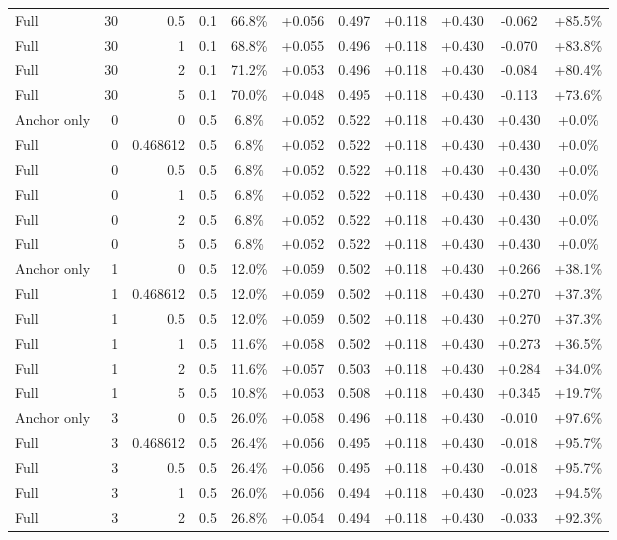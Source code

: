 \begin{table}[htbp]
\begin{tabular}{lrrrccccccc}
Full & 30 & 0.5 & 0.1 & 66.8\% & +0.056 & 0.497 & +0.118 & +0.430 & -0.062 & +85.5\% \\
Full & 30 & 1 & 0.1 & 68.8\% & +0.055 & 0.496 & +0.118 & +0.430 & -0.070 & +83.8\% \\
Full & 30 & 2 & 0.1 & 71.2\% & +0.053 & 0.496 & +0.118 & +0.430 & -0.084 & +80.4\% \\
Full & 30 & 5 & 0.1 & 70.0\% & +0.048 & 0.495 & +0.118 & +0.430 & -0.113 & +73.6\% \\
Anchor only & 0 & 0 & 0.5 & 6.8\% & +0.052 & 0.522 & +0.118 & +0.430 & +0.430 & +0.0\% \\
Full & 0 & 0.468612 & 0.5 & 6.8\% & +0.052 & 0.522 & +0.118 & +0.430 & +0.430 & +0.0\% \\
Full & 0 & 0.5 & 0.5 & 6.8\% & +0.052 & 0.522 & +0.118 & +0.430 & +0.430 & +0.0\% \\
Full & 0 & 1 & 0.5 & 6.8\% & +0.052 & 0.522 & +0.118 & +0.430 & +0.430 & +0.0\% \\
Full & 0 & 2 & 0.5 & 6.8\% & +0.052 & 0.522 & +0.118 & +0.430 & +0.430 & +0.0\% \\
Full & 0 & 5 & 0.5 & 6.8\% & +0.052 & 0.522 & +0.118 & +0.430 & +0.430 & +0.0\% \\
Anchor only & 1 & 0 & 0.5 & 12.0\% & +0.059 & 0.502 & +0.118 & +0.430 & +0.266 & +38.1\% \\
Full & 1 & 0.468612 & 0.5 & 12.0\% & +0.059 & 0.502 & +0.118 & +0.430 & +0.270 & +37.3\% \\
Full & 1 & 0.5 & 0.5 & 12.0\% & +0.059 & 0.502 & +0.118 & +0.430 & +0.270 & +37.3\% \\
Full & 1 & 1 & 0.5 & 11.6\% & +0.058 & 0.502 & +0.118 & +0.430 & +0.273 & +36.5\% \\
Full & 1 & 2 & 0.5 & 11.6\% & +0.057 & 0.503 & +0.118 & +0.430 & +0.284 & +34.0\% \\
Full & 1 & 5 & 0.5 & 10.8\% & +0.053 & 0.508 & +0.118 & +0.430 & +0.345 & +19.7\% \\
Anchor only & 3 & 0 & 0.5 & 26.0\% & +0.058 & 0.496 & +0.118 & +0.430 & -0.010 & +97.6\% \\
Full & 3 & 0.468612 & 0.5 & 26.4\% & +0.056 & 0.495 & +0.118 & +0.430 & -0.018 & +95.7\% \\
Full & 3 & 0.5 & 0.5 & 26.4\% & +0.056 & 0.495 & +0.118 & +0.430 & -0.018 & +95.7\% \\
Full & 3 & 1 & 0.5 & 26.0\% & +0.056 & 0.494 & +0.118 & +0.430 & -0.023 & +94.5\% \\
Full & 3 & 2 & 0.5 & 26.8\% & +0.054 & 0.494 & +0.118 & +0.430 & -0.033 & +92.3\% \\

\end{tabular}
\end{table}
